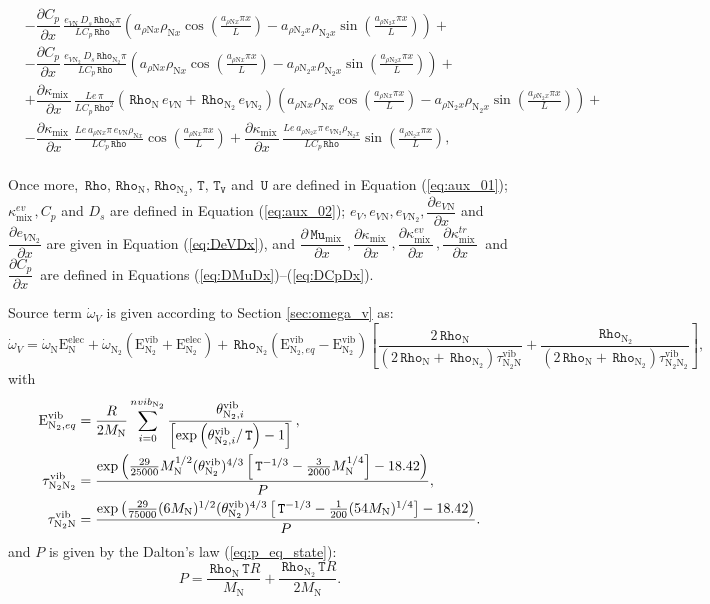 \documentclass[10pt]{article}
\newcommand{\diff}[2] {\dfrac{\partial #1 }{\partial #2}}
\newcommand{\Rho}{\,\mathtt{Rho}}
\newcommand{\T}{\,\mathtt{T}}
\newcommand{\U}{\,\mathtt{U}}
\newcommand{\TV}{\,\mathtt{T_V}}
\newcommand{\N}{\text{N}}
\newcommand{\elec}{\text{elec}}
\newcommand{\vib}{\text{vib}}
\newcommand{\E}{\text{E}}
\newcommand{\Mu}{\, \mathtt{Mu}}
\newcommand{\mix}{\text{mix}\,}
\newcommand{\DKappaDx}{\diff{\kappa_{\mix}}{x}\,}
\newcommand{\DKappaevDx}{\diff{\kappa^{ev}_{\mix}}{x}\,}
\newcommand{\DKappatrDx}{\diff{\kappa^{tr}_{\mix}}{x}\,}
\newcommand{\DCpDx}{\diff{C_p}{x}\,}
\newcommand{\DMuDx}{\diff{\Mu_{\mix}}{x}\,}
\newcommand{\DeVNDx}{\diff{e_{V \N}}{x}}
\newcommand{\DeVNNDx}{\diff{e_{V \N_2}}{x}}
\begin{document}
\begin{equation*}
\begin{split}
%
& - \DCpDx \frac{e_{V {\N}} \, D_s \Rho_{\N} \pi }{L C_p \Rho}\left(a_{ \rho \N x} \rho_{\N x} \cos\left(\frac{a_{ \rho \N x} \pi x}{L}\right) - a_{ \rho \N_2 x} \rho_{\N_2 x} \sin\left(\frac{a_{ \rho \N_2 x} \pi x}{L}\right)\right) +\\ 
%
&- \DCpDx \frac{e_{V {\N_2}} \, D_s \Rho_{\N_2} \pi }{L C_p \Rho}\left(a_{ \rho \N x} \rho_{\N x} \cos\left(\frac{a_{ \rho \N x} \pi x}{L}\right) - a_{ \rho \N_2 x} \rho_{\N_2 x} \sin\left(\frac{a_{ \rho \N_2 x} \pi x}{L}\right)\right) +\\ 
%
&+ \DKappaDx \frac{ Le \, \pi }{L C_p\Rho^{2}} \left(\Rho_{\N} \, e_{V {\N}} + \Rho_{\N_2} \, e_{V {\N_2}}\right) \left(a_{ \rho \N x} \rho_{\N x} \cos\left(\frac{a_{ \rho \N x} \pi x}{L}\right) - a_{ \rho \N_2 x} \rho_{\N_2 x} \sin\left(\frac{a_{ \rho \N_2 x} \pi x}{L}\right)\right)+\\
%
&- \DKappaDx \frac{ Le \, a_{ \rho \N x} \pi \, e_{V {\N}} \rho_{\N x} }{L C_p\Rho}\cos\left(\frac{a_{ \rho \N x} \pi x}{L}\right) + \DKappaDx \frac{ Le \, a_{ \rho \N_2 x} \pi \, e_{V {\N_2}} \rho_{\N_2 x} }{L C_p \Rho} \sin\left(\frac{a_{ \rho \N_2 x} \pi x}{L}\right),\\
%
\end{split}
\end{equation*}

Once more, $\Rho,\Rho_\N, \Rho_{\N_2}, \T, \TV$ and $\U$ are defined in Equation (\ref{eq:aux_01}); $\kappa^{ev}_{\mix}, C_p$ and $D_s$ are defined in Equation (\ref{eq:aux_02}); $e_V, e_{V\N},e_{V\N_2}, \DeVNDx$ and $\DeVNNDx$ are given in Equation (\ref{eq:DeVDx}), and $\DMuDx, \DKappaDx,\DKappaevDx,\DKappatrDx$ and $\DCpDx$ are defined in Equations (\ref{eq:DMuDx})--(\ref{eq:DCpDx}).

%
Source term $\dot{\omega}_V$ is given according to Section \ref{sec:omega_v} as:
$$\dot{\omega}_V = \dot{\omega}_\N \E_{\N}^{\elec} + \dot{\omega}_{\N_2} (\E_{\N_2}^{\vib}+\E_{\N_2}^{\elec})+\Rho_{\N_2} (\E_{\N_2,eq}^{\vib}-\E_{\N_2}^{\vib}) \left[\dfrac{2 \Rho_{\N}}{(2 \Rho_{\N}+\Rho_{\N_2}) \tau^{\vib}_{\N_2\N}}+\dfrac{\Rho_{\N_2}}{(2 \Rho_{\N}+\Rho_{\N_2}) \tau^{\vib}_{\N_2\N_2}}\right],$$
with
\begin{equation}
\begin{split}
\E_{\N_2, eq}^{\vib} &=\dfrac{ R}{2 M_\N } \sum_{i=0}^{nvib_{\N_2}} \dfrac{  \theta^{\vib}_{\N_2,i} }{\left[ \exp \left( \theta^{\vib}_{\N_2,i} / \T \right)-1 \right]} \,, \vspace{5pt}\\
\tau^{\vib}_{\N_2\N_2} &= \dfrac{ \exp\left(\frac{29}{25000} M_\N^{1/2} (\theta^{\vib}_{\N_2})^{4/3}  \left[\T^{-1/3}-\frac{3}{2000} M_\N^{1/4}\right] -18.42\right)}{P}, \vspace{5pt}\\
\tau^{\vib}_{\N_2\N} &=\dfrac{ \exp\left(\frac{29}{75000} (6 M_\N)^{1/2} (\theta^{\vib}_{\N_2})^{4/3} \left[\T^{-1/3} -\frac{1}{200} (54M_\N)^{1/4}\right]-18.42\right)}{P}.
\end{split}
\end{equation}
and $P$ is given by the Dalton's law (\ref{eq:p_eq_state}):
$$P = \dfrac{\Rho_{\N}  \T R}{M_\N}+ \dfrac{\Rho_{\N_2}  \T R}{2 M_\N}.$$
\end{document}
